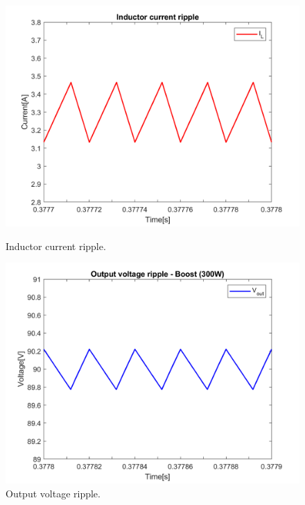 \begin{figure}[H]
	\begin{minipage}[c]{0.5\textwidth}
		\centering
		\includegraphics[width=1\textwidth]{../Pictures/P1/Open_loop_simulation/open_loop_IL_ripple} %
		\caption{Inductor current ripple.}
		\label{fig:inductor_ripple}
	\end{minipage}
	\hfill
	\begin{minipage}[c]{0.5\textwidth}
		\centering
		\includegraphics[width=1\textwidth]{../Pictures/P1/Open_loop_simulation/open_loop_Vout_ripple} %
		\caption{Output voltage ripple.}
		\label{fig:output_voltage_ripple}
	\end{minipage}  
\end{figure}

